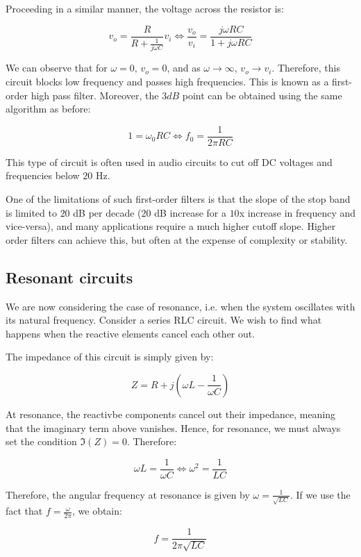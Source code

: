 \documentclass{article}
\begin{document}
Proceeding in a similar manner, the voltage across the resistor is:

\[ v_o = \frac{R}{R + \frac{1}{j\omega C}}v_i \iff \frac{v_o}{v_i} = \frac{j\omega RC}{1 + j\omega RC} \]

We can observe that for $\omega = 0$, $v_o = 0$, and as $\omega \to \infty$, $v_o \to v_i$. Therefore, this circuit blocks low frequency and passes high frequencies. This is known as a first-order high pass filter. Moreover, the $3dB$ point can be obtained using the same algorithm as before:

\[ 1 = \omega_0RC \iff f_0 = \frac{1}{2\pi RC} \]

This type of circuit is often used in audio circuits to cut off DC voltages and frequencies below $20$ Hz.

One of the limitations of such first-order filters is that the slope of the stop band is limited to $20$ dB per decade ($20$ dB increase for a $10$x increase in frequency and vice-versa), and many applications require a much higher cutoff slope. Higher order filters can achieve this, but often at the expense of complexity or stability.

\newpage

\subsection{Resonant circuits}

\begin{proposition}
We are now considering the case of resonance, i.e. when the system oscillates with its natural frequency. Consider a series RLC circuit. We wish to find what happens when the reactive elements cancel each other out.

The impedance of this circuit is simply given by:

\[ Z = R + j(\omega L - \frac{1}{\omega C}) \]

At resonance, the reactivbe components cancel out their impedance, meaning that the imaginary term above vanishes. Hence, for resonance, we must always set the condition $\Im(Z) = 0$. Therefore:

\[ \omega L = \frac{1}{\omega C} \iff \omega^2 = \frac{1}{LC} \]

Therefore, the angular frequency at resonance is given by $\omega = \frac{1}{\sqrt{LC}}$. If we use the fact that $f = \frac{\omega}{2\pi}$, we obtain:

\[ f = \frac{1}{2\pi\sqrt{LC}} \]

\end{proposition}
\end{document}
